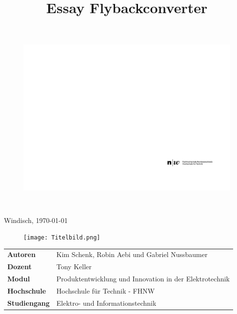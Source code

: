 \documentclass[final]{fhnwreport}       %
\title{Essay Flybackconverter}  		        %
\begin{document}
\thispagestyle{empty}
	\begin{figure}
		 \vspace*{-\topskip}\vspace*{-\headsep}
		\includegraphics[scale=1]{graphics/fhnw_ht_logo_de.pdf}
	\end{figure}

	
	\begin{center}
		\vspace*{2cm}
		{\huge{\textbf{\thetitle}}}\\
		\vspace*{0.5cm}
		
		 
		\Large{Windisch, \today}
		
		\vspace*{-1cm}						    %
		\vfill
		\begin{figure}[H]
		\centering
		\texttt{[image: Titelbild.png]}
		\end{figure}
		
	
		\vfill
		
		\begin{normalsize}
			{
			\renewcommand\arraystretch{2}
			\begin{tabular}{>{\bf}p{4cm} l}
			Autoren   		           & Kim Schenk, Robin Aebi und	Gabriel Nussbaumer\\
			Dozent                 &    Tony Keller\\
			Modul		               &    Produktentwicklung und Innovation in der Elektrotechnik\\
			Hochschule                 &    Hochschule für Technik - FHNW\\
			Studiengang                &    Elektro- und Informationstechnik\\
			\end{tabular}
			}
		\end{normalsize}
	\end{center}
\clearpage
			
\end{document}
